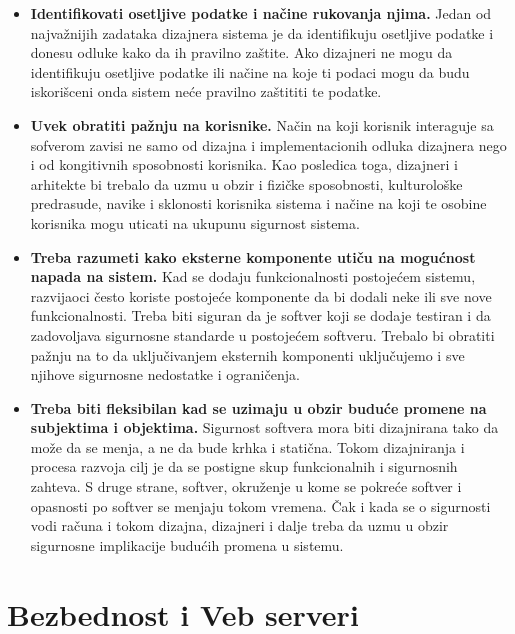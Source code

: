 \documentclass[a4paper]{article}
\begin{document}
\begin{itemize}
\item \textbf{Identifikovati osetljive podatke i načine rukovanja njima.}
    Jedan od najvažnijih zadataka dizajnera sistema je da identifikuju osetljive podatke i donesu odluke kako da ih pravilno zaštite. Ako dizajneri ne mogu da identifikuju osetljive podatke ili načine na koje ti podaci mogu da budu iskorišceni onda sistem neće pravilno zaštititi te podatke.
\item \textbf{Uvek obratiti pažnju na korisnike.}
    Način na koji korisnik interaguje sa sofverom zavisi ne samo od dizajna i implementacionih odluka dizajnera nego i od kongitivnih sposobnosti korisnika. Kao posledica toga, dizajneri i arhitekte bi trebalo da uzmu u obzir i fizičke sposobnosti, kulturološke predrasude, navike i sklonosti korisnika sistema i načine na koji te osobine korisnika mogu uticati na ukupunu sigurnost sistema.
\item \textbf{Treba razumeti kako eksterne komponente utiču na mogućnost napada na sistem.}
    Kad se dodaju funkcionalnosti postojećem sistemu, razvijaoci često koriste postojeće komponente da bi dodali neke ili sve nove funkcionalnosti. Treba biti siguran da je softver koji se dodaje testiran i da zadovoljava sigurnosne standarde u postojećem softveru. Trebalo bi obratiti pažnju na to da uključivanjem eksternih komponenti uključujemo i sve njihove sigurnosne nedostatke i ograničenja.
\item \textbf{Treba biti fleksibilan kad se uzimaju u obzir buduće promene na subjektima i objektima.}
    Sigurnost softvera mora biti dizajnirana tako da može da se menja, a ne da bude krhka i statična. Tokom dizajniranja i procesa razvoja cilj je da se postigne skup funkcionalnih i sigurnosnih zahteva. S druge strane, softver, okruženje u kome se pokreće softver i opasnosti po softver se menjaju tokom vremena. Čak i kada se o sigurnosti vodi računa i tokom dizajna, dizajneri i dalje treba da uzmu u obzir sigurnosne implikacije budućih promena u sistemu.
\end{itemize}

\section{Bezbednost i Veb serveri}
\label{sec:bezbednosni propusti prilikom implementacije Veb servera}
\end{document}
